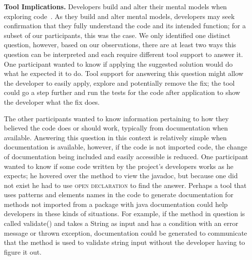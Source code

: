 \documentclass[conference]{IEEEtran}
\begin{document}
\noindent\textbf{Tool Implications.} Developers build and alter their mental models when exploring code~\cite{canas1994mental, burkhardt1997mental}. 
As they build and alter mental models, developers may seek confirmation that they fully understand the code and its intended function; for a subset of our participants, this was the case. 
We only identified one distinct question, however, based on our observations, there are at least two ways this question can be interpreted and each require different tool support to answer it.
One participant wanted to know if applying the suggested solution would do what he expected it to do. 
Tool support for answering this question might allow the developer to easily apply, explore and potentially remove the fix; the tool could go a step further and run the tests for the code after application to show the developer what the fix does.

The other participants wanted to know information pertaining to how they believed the code does or should work, typically from documentation when available. 
Answering this question in this context is relatively simple when documentation is available, however, if the code is not imported code, the change of documentation being included and easily accessible is reduced.
One participant wanted to know if some code written by the project's developers works as he expects; he hovered over the method to view the javadoc, but because one did not exist he had to use \textsc{open declaration} to find the answer.
Perhaps a tool that uses patterns and elements names in the code to generate documentation for methods not imported from a package with java documentation could help developers in these kinds of situations.
For example, if the method in question is called validate() and takes a String as input and has a condition with an error message or thrown exception, documentation could be generated to communicate that the method is used to validate string input without the developer having to figure it out.


\end{document}
